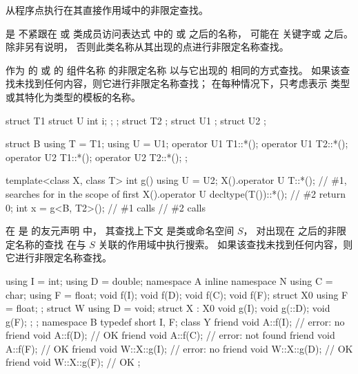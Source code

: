 \pnum
{}
从程序点执行在其直接作用域中的非限定查找。

\pnum
{} 是
不紧跟在  或
类成员访问表达式 中的  或 \tcode{->} 之后的名称，
可能在  关键字或 \tcode{\~} 之后。
除非另有说明，
否则此类名称从其出现的点进行非限定名称查找。

\pnum
作为  的  或  的
组件名称 的非限定名称
以与它出现的  相同的方式查找。
如果该查找未找到任何内容，则它进行非限定名称查找；
在每种情况下，只考虑表示
类型或其特化为类型的模板的名称。
\begin{example}
\begin{codeblock}
struct T1 { struct U { int i; }; };
struct T2 { };
struct U1 {};
struct U2 {};

struct B {
  using T = T1;
  using U = U1;
  operator U1 T1::*();
  operator U1 T2::*();
  operator U2 T1::*();
  operator U2 T2::*();
};

template<class X, class T>
int g() {
  using U = U2;
  X().operator U T::*();                // \#1, searches for  in the scope of  first
  X().operator U decltype(T())::*();    // \#2
  return 0;
}
int x = g<B, T2>();                     // \#1 calls 
                                        // \#2 calls 
\end{codeblock}
\end{example}

\pnum
在  是  的友元声明  中，
其查找上下文 是类或命名空间 $S$，
对出现在  之后的非限定名称的查找
在与 $S$ 关联的作用域中执行搜索。
如果该查找未找到任何内容，则它进行非限定名称查找。
\begin{example}
\begin{codeblock}
using I = int;
using D = double;
namespace A {
  inline namespace N {using C = char; }
  using F = float;
  void f(I);
  void f(D);
  void f(C);
  void f(F);
}
struct X0 {using F = float; };
struct W {
  using D = void;
  struct X : X0 {
    void g(I);
    void g(::D);
    void g(F);
  };
};
namespace B {
  typedef short I, F;
  class Y {
    friend void A::f(I);        // error: no 
    friend void A::f(D);        // OK
    friend void A::f(C);        // error:  not found
    friend void A::f(F);        // OK
    friend void W::X::g(I);     // error: no 
    friend void W::X::g(D);     // OK
    friend void W::X::g(F);     // OK
  };
}
\end{codeblock}
\end{example}


